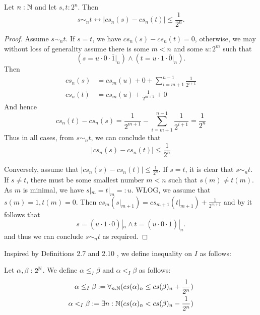  
\begin{corollary}\label{alternativeSimByCauchyDistance}
  Let $n:\mathbb{N}$ and let $s,t:2^n$. Then 
  \begin{equation}
    s\sim_n t \leftrightarrow |cs_n(s) - cs_n(t)| \leq \frac{1}{2^{n}}.
  \end{equation} 
\end{corollary}

\begin{proof}
  \item  
    Assume $ s \sim_n t$. If $s=t$, we have $cs_n(s) - cs_n(t) = 0$, 
    otherwise, we may without loss of generality assume there is some $m<n$ and some $u:2^m$ such that 
  \begin{equation}
    (s = u \cdot 0 \cdot \overline 1|_n) \wedge ( t = u \cdot 1 \cdot \overline 0 |_n) . 
  \end{equation}
  Then 
  \begin{align}
    cs_n(s) &= 
    cs_m(u) + 0 + \sum\limits_{i = m+1}^{n-1} \frac{1}{2^{i+1}}\\
    cs_n(t) &= 
    cs_m(u) + \frac{1}{2^{m+1}} + 0  
  \end{align}
  And hence 
  \begin{equation}
    cs_n(t) - cs_n(s) = \frac{1}{2^{m+1}} - \sum\limits_{i = m+1}^{n-1} \frac{1}{2^{i+1}} = \frac{1}{2^n}
  \end{equation}
  Thus in all cases, from $s\sim_n t$, we can conclude that 
  \begin{equation}
    |cs_n(s) -cs_n(t) |\leq \frac{1}{2^n}
  \end{equation}
  \item 
  Conversely, assume that $|cs_n(s) - cs_n(t)| \leq \frac{1}{2^n}$. 
  If $s = t$, it is clear that $s \sim_n t$.
  If $s\neq t$, there must be some smallest number $m<n$ such that 
  $s(m) \neq t(m)$. As $m$ is minimal, we have $s|_m = t|_m = : u$. 
  WLOG, we assume that $s(m) = 1, t(m) = 0$. 
  Then $cs_m(s|_{m+1})  = cs_{m+1}(t|_{m+1}) + \frac{1}{2^{m+1}}$
  and by  it follows that 
  \begin{equation}
    s = (u \cdot 1\cdot \overline 0) |_n \wedge 
    t = (u \cdot 0\cdot \overline 1) |_n.
  \end{equation}
  and thus we can conclude $s\sim_n t$ as required. 
\end{proof}


Inspired by Definitions 2.7 and 2.10 \Cite{Bishop}, 
we define inequality on $I$ as follows:
\begin{definition}
  Let $\alpha,\beta:2^{\mathbb{N}}$. 
  We define $\alpha\leq_I \beta$ and $\alpha<_I\beta$ as follows:
  \begin{align}
  \alpha\leq_I\beta : = \forall_{n:\mathbb{N}} ( cs(\alpha)_n \leq cs(\beta)_n + \frac {1} {2^n})\\ 
    \alpha   <_I \beta : = \exists{n:\mathbb{N}} ( cs(\alpha)_n < cs(\beta)_n - \frac {1} {2^n})
\end{align}
\end{definition}

